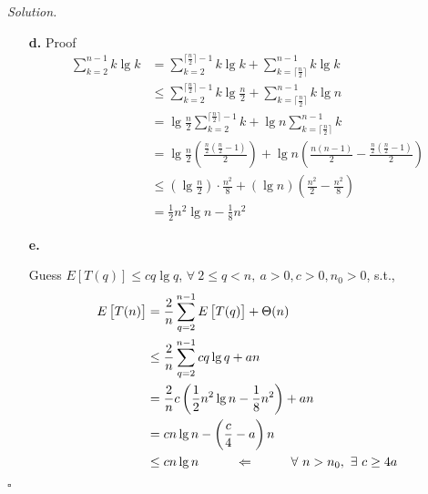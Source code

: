 \documentclass[11pt]{article}
\theoremstyle{definition}
\newenvironment{solution}{\noindent\emph{Solution.}}{\hfill$\square$}
\newcommand\tab[1][1cm]{\hspace*{#1}}
\begin{document}
\begin{solution}
\begin{enumerate}
     \item[\textbf{d.}]
     Proof
     \begin{align*}
\sum_{k=2}^{n-1} k \lg k
&= \sum_{k=2}^{\lceil \frac{n}{2} \rceil -1} k \lg k + \sum_{k=\lceil \frac{n}{2} \rceil}^{n-1} k \lg k \\
&\leq \sum_{k=2}^{\lceil \frac{n}{2} \rceil -1} k \lg \frac{n}{2} + \sum_{k=\lceil \frac{n}{2} \rceil}^{n-1} k \lg n \\
&= \lg \frac{n}{2}  \sum_{k=2}^{\lceil \frac{n}{2} \rceil -1} k + \lg n \sum_{k=\lceil \frac{n}{2} \rceil}^{n-1} k  \\
&= \lg \frac{n}{2} \left(  \frac{\frac{n}{2}(\frac{n}{2}-1)}{2}  \right) +  \lg n \left( \frac{n(n-1)}{2} - \frac{\frac{n}{2}(\frac{n}{2}-1)}{2}  \right) \\
&\leq \left( \lg \frac{n}{2} \right) \cdot \frac{n^2}{8} + \left( \lg n \right) \left( \frac{n^2}{2} - \frac{n^2}{8} \right)  \\
&= \frac{1}{2} n^2 \lg n - \frac{1}{8} n^2
     \end{align*}
     
      \item[\textbf{e.}]
    
    Guess $E  \left[   T(q)\right] \leq cq \lg q $, $\forall \ 2 \leq q<n, \ a>0, c>0, n_0>0$, s.t.,
     \begin{align*}
     E \left[  T(n) \right] &=  \frac{2}{n} \sum_{q=2}^{n-1}     E  \left[   T(q)\right]  + \Theta(n) \\
     &\leq \frac{2}{n} \sum_{q=2}^{n-1}     cq \lg q  + an \\
     &= \frac{2}{n} c \left( \frac{1}{2} n^2 \lg n - \frac{1}{8} n^2 \right) + an \\
     &= cn \lg n - \left(      \frac{c}{4}  -a       \right)n \\
     &\leq cn \lg n \tab\Leftarrow\tab \forall \ n>n_0, \ \exists \ c \geq 4a \\
     \end{align*}


\end{enumerate}



\end{solution}
\end{document}
